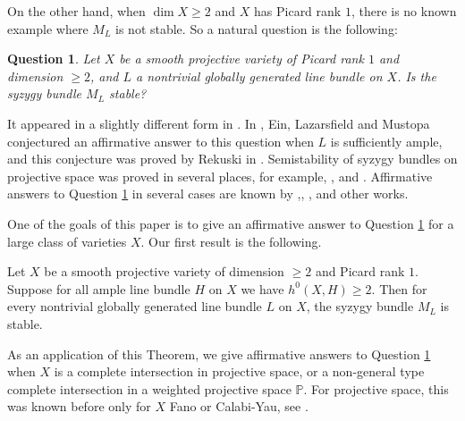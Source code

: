 \documentclass[11pt,letterpaper]{amsart}
\newtheorem{question}[lemma]{Question}
\newenvironment{manualtheorem}[1]{%
  \renewcommand\themanualtheoreminner{#1}%
  \manualtheoreminner
}{\endmanualtheoreminner}
\begin{document}
On the other hand, when $\dim X\geq 2$ and $X$ has Picard rank $1$, there is no known example where $M_L$ is not stable. So a natural question is the following:
\begin{question}\label{syzygy bundle}
    Let $X$ be a smooth projective variety of Picard rank $1$ and dimension $\geq 2$, and $L$ a nontrivial globally generated line bundle on $X$. Is the syzygy bundle $M_L$ stable?
\end{question}
It appeared in a slightly different form in \cite[Question 2]{fulger2022positivity}. In \cite{ein2013stability}, Ein, Lazarsfield and Mustopa conjectured an affirmative answer to this question when $L$ is sufficiently ample, and this conjecture was proved by Rekuski in \cite{MR4728292}. Semistability of syzygy bundles on projective space was proved in several places, for example, \cite[Corollary 2.2]{flenner1984restrictions}, \cite[Corollary 6.5]{ballico1994restriction} and \cite[Corollary 7.1]{brenner2008looking}. Affirmative answers to Question \ref{syzygy bundle} in several cases are known by \cite{camere2012stability},\cite{mukherjee2022note}, \cite{caucci2021stability}, \cite{jiang2025stability} and other works.

One of the goals of this paper is to give an affirmative answer to Question \ref{syzygy bundle} for a large class of varieties $X$. Our first result is the following.

\begin{manualtheorem}{A}\label{A}
Let $X$ be a smooth projective variety of dimension $\geq 2$ and Picard rank $1$.
Suppose for all ample line bundle $H$ on $X$ we have $h^0(X,H)\geq 2$.
Then for every nontrivial globally generated line bundle $L$ on $X$, the syzygy bundle $M_L$ is stable.
\end{manualtheorem}

As an application of this Theorem, we give affirmative answers to Question \ref{syzygy bundle} when $X$ is a complete intersection in projective space, or a non-general type complete intersection in a weighted projective space $\mathbb{P}$. For projective space, this was known before only for $X$ Fano or Calabi-Yau, see \cite{jiang2025stability}. 
\end{document}
